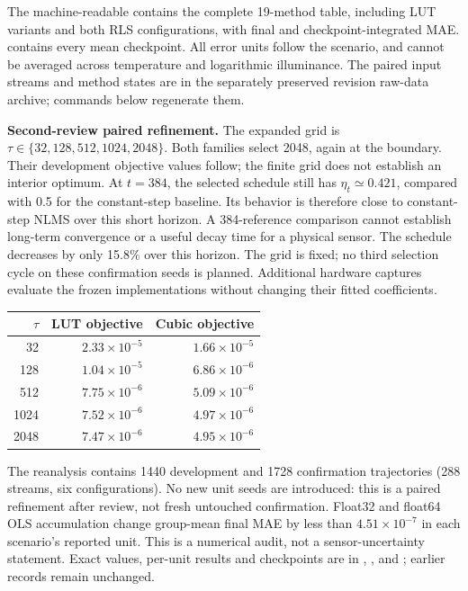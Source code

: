 \documentclass[10pt,letterpaper]{article}
\begin{document}
The machine-readable  contains the complete 19-method table, including LUT variants and both RLS configurations, with final and checkpoint-integrated MAE.  contains every mean checkpoint. All error units follow the scenario, and cannot be averaged across temperature and logarithmic illuminance. The paired input streams and method states are in the separately preserved revision raw-data archive; commands below regenerate them.


\textbf{Second-review paired refinement.} The expanded grid is $\tau\in\{32,128,512,1024,2048\}$. Both families select 2048, again at the boundary. Their development objective values follow; the finite grid does not establish an interior optimum. At $t=384$, the selected schedule still has $\eta_t\simeq0.421$, compared with 0.5 for the constant-step baseline. Its behavior is therefore close to constant-step NLMS over this short horizon. A 384-reference comparison cannot establish long-term convergence or a useful decay time for a physical sensor. The schedule decreases by only 15.8\% over this horizon. The grid is fixed; no third selection cycle on these confirmation seeds is planned. Additional hardware captures evaluate the frozen implementations without changing their fitted coefficients.
\begin{center}\small
\begin{tabular}{rrr}\toprule
$\tau$ & LUT objective & Cubic objective\\\midrule
32 & $2.33\times10^{-5}$ & $1.66\times10^{-5}$\\
128 & $1.04\times10^{-5}$ & $6.86\times10^{-6}$\\
512 & $7.75\times10^{-6}$ & $5.09\times10^{-6}$\\
1024 & $7.52\times10^{-6}$ & $4.97\times10^{-6}$\\
2048 & $7.47\times10^{-6}$ & $4.95\times10^{-6}$\\\bottomrule
\end{tabular}
\end{center}
The reanalysis contains 1440 development and 1728 confirmation trajectories (288 streams, six configurations). No new unit seeds are introduced: this is a paired refinement after review, not fresh untouched confirmation. Float32 and float64 OLS accumulation change group-mean final MAE by less than $4.51\times10^{-7}$ in each scenario's reported unit. This is a numerical audit, not a sensor-uncertainty statement. Exact values, per-unit results and checkpoints are in , , and ; earlier records remain unchanged.
\end{document}

